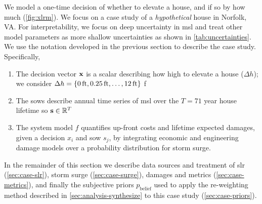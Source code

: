 \documentclass[11pt]{article}
\begin{document}
We model a one-time decision of whether to elevate a house, and if so by how much (\cref{fig:xlrm}).
We focus on a case study of a \emph{hypothetical} house in Norfolk, VA.
For interpretability, we focus on deep uncertainty in \gls{msl} and treat other model parameters as more shallow uncertainties as shown in \cref{tab:uncertainties}.
We use the notation developed in the previous section to describe the case study.
Specifically,
\begin{enumerate}
    \item The decision vector $\vb{x}$ is a scalar describing how high to elevate a house ($\Delta h$); we consider $\Delta h = \qty{\SI{0}{ft}, \SI{0.25}{ft}, \ldots, \SI{12}{ft}}$ f
    \item The \glspl{sow} describe annual time series of \gls{msl} over the $T=71$ year house lifetime so $\vb{s} \in \mathbb{R}^T$
    \item The system model $f$ quantifies up-front costs and lifetime expected damages, given a decision $x_i$ and \gls{sow} $s_j$, by integrating economic and engineering damage models over a probability distribution for storm surge.
\end{enumerate}
In the remainder of this section we describe data sources and treatment of \gls{slr} (\cref{sec:case-slr}), storm surge (\cref{sec:case-surge}), damages and metrics (\cref{sec:case-metrics}), and finally the subjective priors $p_\mathrm{belief}$ used to apply the re-weighting method described in \cref{sec:analysis-synthesize} to this case study (\cref{sec:case-priors}).
\end{document}
